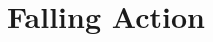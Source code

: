\documentclass[draft]{article}
\begin{document}
\section{Falling Action} %
\begin{comment}
\begin{theorem}
    Let $\lambda_i\ge\mu_i$ be dominant ($i=1,2$), $\mu = \mu_1 +\mu_2$, and $\lambda =\lambda_1+\lambda_2$. 
    There is an isomorphism 
    \begin{equation}
        \overline{\OO}_{\lambda_1,\lambda_2}\cap\TT_{\mu_1,\mu_2} \to \overline\Gr_\AA^{\lambda_1,\lambda_2}\cap \cW_{\mu_1,\mu_2}
    \end{equation}
    got by taking a $\mu\times\mu$ block matrix $A$ in the $s$-fibre $\overline{\OO_{\lambda_1,\lambda_2}^s}\cap\TT_{\mu_1,\mu_2}^s$ on the left to the representative of the $s$-fibre on the right defined by  
    \begin{equation}
        \begin{split}
            g &= t^{\mu_1} (t-s)^{\mu_2} + a(t) \\
            a_{ij}(t) &= - \sum_{k=1}^{\mu_i} A^k_{ji} t^{k-1}
        \end{split}
    \end{equation}
    where $A^k_{ji}$ is the $k$th entry from the left of the last row of the $\mu_j\times\mu_i$ block of $A$. 
\end{theorem}

Let's call this the MVyBD isomorphism.

\begin{proof}
    The proof is fibre by fibre, so fix $s\ne 0$. \acom{Emphasize in the intro later (because this always confuses me) that by the $s$-fibre we really mean the $(0,s)$-fibre; i.e.\ its the BD Grassmannian over the second symmetric power of $C = \AA^1$; better just replace $s$-fibre by $(0,s)$-fibre everywhere it occurs.}
    \begin{enumerate}
        \item The map is well defined. In particular, it defines $\CC[t]$-lattices in $\CC(t)^m$. Moreover, these lattices break down to give pairs of lattices upon inverting $t$ or $t-s$ that have the right properties. [Copy Roger's proof]
        \item The inverse map is got by taking the matrix of multiplication by $t$.  More precisely, let $ L \in Gr^{BD} \cap \cW_\mu$.  We work with the quotient $\CC[t]^m/L$ just as in the ordinary MVy isomorphism---the only difference being $\CC\xt$ is replaced by $\CC[t]$.
\begin{enumerate}
    \item 
    We claim that 
    \begin{equation}
        \{[e_i],[te_i],\dots,[t^{\mu_{i}-1}e_i] : 1\le i \le m\}
    \end{equation}
    is a $\CC$-basis of $\CC[t]^m/L$.
    

\end{comment}
\end{document}
